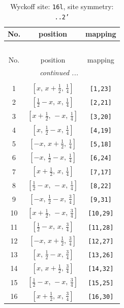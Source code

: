\documentclass[fleqn,8pt]{jsarticle}
\begin{document}
\renewcommand{\arraystretch}{1.2}
\begin{longtable}{ccc}
\caption{Wyckoff site: {\tt 16l}, site symmetry: {\tt ..2'}}
 \\
 \hline \hline
No. & position & mapping \\ \hline \endfirsthead

\multicolumn{2}{l}{\tablename\ \thetable{}} \\
 \hline \hline
No. & position & mapping \\ \hline \endhead

 \hline \hline
\multicolumn{2}{r}{\footnotesize\it continued ...} \\ \endfoot

 \hline \hline
\multicolumn{2}{r}{} \\ \endlastfoot

1 & $\left[ x,\, x + \frac{1}{2},\, \frac{1}{4} \right]$ & {\tt [1,23]} \\ \hline
2 & $\left[ \frac{1}{2} - x,\, x,\, \frac{1}{4} \right]$ & {\tt [2,21]} \\ \hline
3 & $\left[ x + \frac{1}{2},\, - x,\, \frac{1}{4} \right]$ & {\tt [3,20]} \\ \hline
4 & $\left[ x,\, \frac{1}{2} - x,\, \frac{1}{4} \right]$ & {\tt [4,19]} \\ \hline
5 & $\left[ - x,\, x + \frac{1}{2},\, \frac{1}{4} \right]$ & {\tt [5,18]} \\ \hline
6 & $\left[ - x,\, \frac{1}{2} - x,\, \frac{1}{4} \right]$ & {\tt [6,24]} \\ \hline
7 & $\left[ x + \frac{1}{2},\, x,\, \frac{1}{4} \right]$ & {\tt [7,17]} \\ \hline
8 & $\left[ \frac{1}{2} - x,\, - x,\, \frac{1}{4} \right]$ & {\tt [8,22]} \\ \hline
9 & $\left[ - x,\, \frac{1}{2} - x,\, \frac{3}{4} \right]$ & {\tt [9,31]} \\ \hline
10 & $\left[ x + \frac{1}{2},\, - x,\, \frac{3}{4} \right]$ & {\tt [10,29]} \\ \hline
11 & $\left[ \frac{1}{2} - x,\, x,\, \frac{3}{4} \right]$ & {\tt [11,28]} \\ \hline
12 & $\left[ - x,\, x + \frac{1}{2},\, \frac{3}{4} \right]$ & {\tt [12,27]} \\ \hline
13 & $\left[ x,\, \frac{1}{2} - x,\, \frac{3}{4} \right]$ & {\tt [13,26]} \\ \hline
14 & $\left[ x,\, x + \frac{1}{2},\, \frac{3}{4} \right]$ & {\tt [14,32]} \\ \hline
15 & $\left[ \frac{1}{2} - x,\, - x,\, \frac{3}{4} \right]$ & {\tt [15,25]} \\ \hline
16 & $\left[ x + \frac{1}{2},\, x,\, \frac{3}{4} \right]$ & {\tt [16,30]} \\
\end{longtable}
\end{document}
